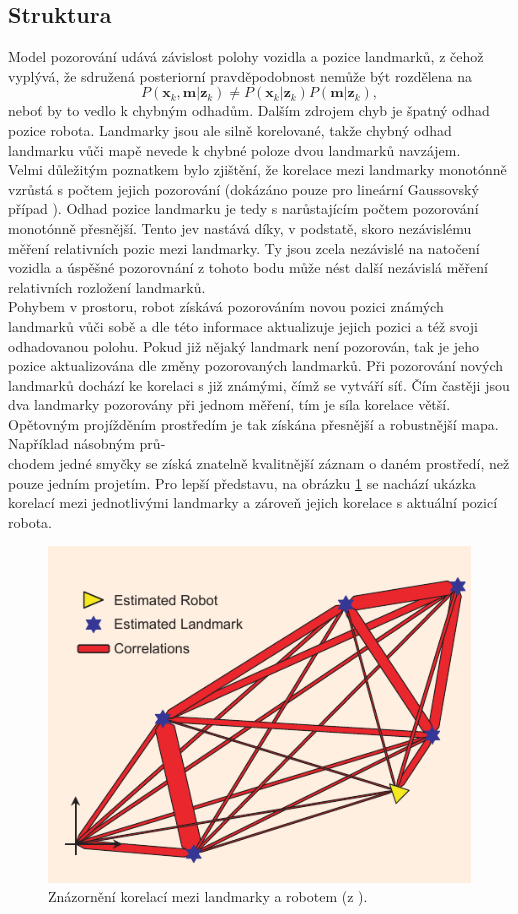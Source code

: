 \documentclass[12pt]{report}
\begin{document}
\subsection{Struktura}
Model pozorování udává závislost polohy vozidla a pozice landmarků, z čehož vyplývá, že sdružená posteriorní pravděpodobnost nemůže být rozdělena na
\begin{equation}
	P(\textbf{x}_k,\textbf{m}|\textbf{z}_k)\neq P(\textbf{x}_k|\textbf{z}_k)P(\textbf{m}|\textbf{z}_k),
\end{equation}
neboť by to vedlo k chybným odhadům. Dalším zdrojem chyb je špatný odhad pozice robota. Landmarky jsou ale silně korelované, takže chybný odhad landmarku vůči mapě nevede k chybné poloze dvou landmarků navzájem.\\
\indent Velmi důležitým poznatkem bylo zjištění, že korelace mezi landmarky monotónně vzrůstá s počtem jejich pozorování (dokázáno pouze pro lineární Gaussovský případ \cite{Dissanayake2001}). Odhad pozice landmarku je tedy s narůstajícím počtem pozorování monotónně přesnější. Tento jev nastává díky, v podstatě, skoro nezávislému měření relativních pozic mezi landmarky. Ty jsou zcela nezávislé na natočení vozidla a úspěšné pozorovnání z tohoto bodu může nést další nezávislá měření relativních rozložení landmarků. \\
\indent Pohybem v prostoru, robot získává pozorováním novou pozici známých landmarků vůči sobě a dle této informace aktualizuje jejich pozici a též svoji odhadovanou polohu. Pokud již nějaký landmark není pozorován, tak je jeho pozice aktualizována dle změny pozorovaných landmarků. Při pozorování nových landmarků dochází ke korelaci s již známými, čímž se vytváří síť. Čím častěji jsou dva landmarky pozorovány při jednom měření, tím je síla korelace větší. Opětovným projížděním prostředím je tak získána přesnější a robustnější mapa. Například násobným prů-\\chodem jedné smyčky se získá znatelně kvalitnější záznam o daném prostředí, než pouze jedním projetím. Pro lepší představu, na obrázku \ref{fig:SLAM_corelations} se nachází ukázka korelací mezi jednotlivými landmarky a zároveň jejich korelace s aktuální pozicí robota.\\

\begin{figure}[!ht]
	\begin{center}
		\includegraphics[width=0.6\columnwidth]{imgs/SLAM_corelations.pdf}
	\end{center}
	\caption{Znázornění korelací mezi landmarky a robotem (z \cite{Durrant-Whyte2006}).}
	\label{fig:SLAM_corelations}
\end{figure}
\end{document}
